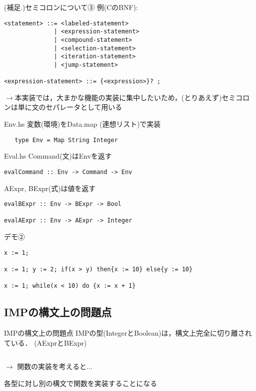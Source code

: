 \documentclass[uplatex,dvipdfmx,ja=standard]{beamer}
\begin{document}
\begin{frame}[fragile]{(補足.)セミコロンについて③}
    例(CのBNF):
    \begin{verbatim}
<statement> ::= <labeled-statement>
              | <expression-statement>
              | <compound-statement>
              | <selection-statement>
              | <iteration-statement>
              | <jump-statement>

<expression-statement> ::= {<expression>}? ;
    \end{verbatim}
    $\to$本実装では，大まかな機能の実装に集中したいため，(とりあえず)セミコロンは単に文のセパレータとして用いる
\end{frame}

\begin{frame}[fragile]{Env.hs}
    変数(環境)をData.map (連想リスト)で実装
   \begin{verbatim}
   type Env = Map String Integer 
    \end{verbatim}
\end{frame}

\begin{frame}[fragile]{Eval.hs}
    Command(文)はEnvを返す
   \begin{verbatim}
evalCommand :: Env -> Command -> Env
    \end{verbatim}
    AExpr, BExpr(式)は値を返す
    \begin{verbatim}
evalBExpr :: Env -> BExpr -> Bool

evalAExpr :: Env -> AExpr -> Integer
    \end{verbatim}
\end{frame}

\begin{frame}[fragile]{デモ②}
    \begin{verbatim}
x := 1; 

x := 1; y := 2; if(x > y) then{x := 10} else{y := 10}

x := 1; while(x < 10) do {x := x + 1}
    \end{verbatim}
\end{frame}

\subsection{IMPの構文上の問題点}

\begin{frame}[fragile]{IMPの構文上の問題点}
    IMPの型(IntegerとBoolean)は，構文上完全に切り離されている．
    (AExprとBExpr)
    \begin{verbatim}
    \end{verbatim}
    $\to$ 関数の実装を考えると...

    各型に対し別の構文で関数を実装することになる
\end{frame}
\end{document}

